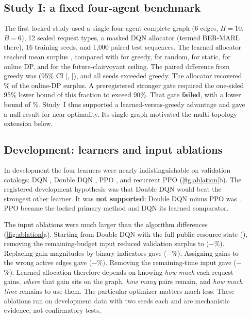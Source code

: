 \documentclass[11pt,a4paper]{article}
\begin{document}
\subsection{Study I: a fixed four-agent benchmark}\label{sec:studyone}

The first locked study used a single four-agent complete graph (6 edges, $H=10$, $B=6$), 12 sealed request types, a masked DQN allocator (termed BER-MARL there), 16 training seeds, and 1{,}000 paired test sequences. The learned allocator reached mean surplus \sOneBer, compared with \sOneGreedy{} for greedy, \sOneRandom{} for random, \sOneStatic{} for static, \sOneDP{} for online DP, and \sOneFuture{} for the future-clairvoyant ceiling. The paired difference from greedy was \sOneDiff{} (95\% CI [\sOneDiffLo, \sOneDiffHi]), and all \sOneSeedsAbove{} seeds exceeded greedy. The allocator recovered \sOneFrac\% of the online-DP surplus. A preregistered stronger gate required the one-sided 95\% lower bound of this fraction to exceed 90\%. That gate \textbf{failed}, with a lower bound of \sOneFracLo\%. Study~I thus supported a learned-versus-greedy advantage and gave a null result for near-optimality. Its single graph motivated the multi-topology extension below.

\subsection{Development: learners and input ablations}\label{sec:development}

In development the four learners were nearly indistinguishable on validation catalogs: DQN \develDQN, Double DQN \develDDQN, PPO \develPPO, and recurrent PPO \develRPPO{} (\cref{fig:ablation}b). The registered development hypothesis was that Double DQN would beat the strongest other learner. It was \textbf{not supported}: Double DQN minus PPO was \develDDQNMinusPPO. PPO became the locked primary method and DQN its learned comparator.

The input ablations were much larger than the algorithm differences (\cref{fig:ablation}a). Starting from Double DQN with the full public resource state (\develDDQN), removing the remaining-budget input reduced validation surplus to \ablNoBudget{} ($-$\ablDropNoBudget\%). Replacing gain magnitudes by binary indicators gave \ablBinary{} ($-$\ablDropBinary\%). Assigning gains to the wrong active edges gave \ablShuffled{} ($-$\ablDropShuffled\%). Removing the remaining-time input gave \ablNoHorizon{} ($-$\ablDropNoHorizon\%). Learned allocation therefore depends on knowing \emph{how much} each request gains, \emph{where} that gain sits on the graph, \emph{how many} pairs remain, and \emph{how much time} remains to use them. The particular optimizer matters much less. These ablations ran on development data with two seeds each and are mechanistic evidence, not confirmatory tests.
\end{document}
